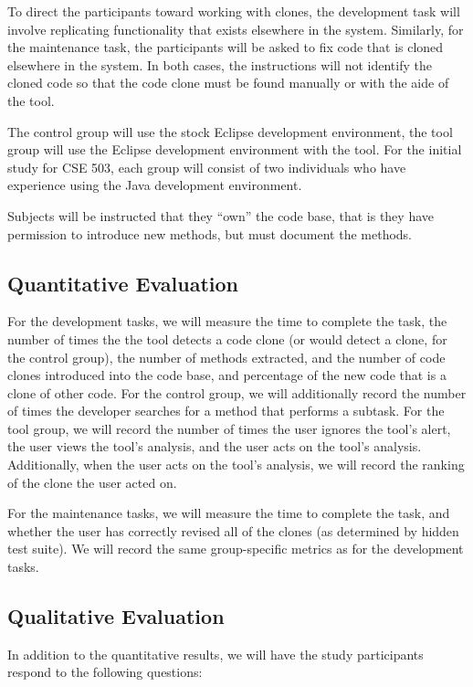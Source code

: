 \documentclass[preprint,10pt]{sigplanconf}
\newcommand{\todo}[1]{{\bfseries [[#1]]}}
\begin{document}
To direct the participants toward working with clones, the development
task will involve replicating functionality that exists elsewhere in
the system. Similarly, for the maintenance task, the participants will
be asked to fix code that is cloned elsewhere in the system. In both
cases, the instructions will not identify the cloned code so that the
code clone must be found manually or with the aide of the tool.


The control group will use the stock Eclipse development
environment, the tool group will use the Eclipse development
environment with the tool. For the initial study for CSE 503, each
group will consist of two individuals who have experience using the
Java development environment.  

Subjects will be instructed that they ``own'' the code base, that is they
have permission to introduce new methods, but must document the
methods.  

\subsection{Quantitative Evaluation}
For the development tasks, we will measure the time to complete the
task, the number of times the the tool detects a code clone (or would
detect a clone, for the control group),
the number of methods extracted, and the number of code clones
introduced into the code base, and percentage of the new code that is
a clone of other code. 
For the control group, we will additionally
record the number of times the developer searches for a method that
performs a subtask. 
For the tool group, we will record the number of
times the user ignores the tool's
alert, the user views the tool's analysis, and the user acts on the
tool's analysis. Additionally, when the user acts on the tool's
analysis, we will record the ranking of the clone the user acted on.

For the maintenance tasks, we will measure the time to complete the
task, and whether the user has correctly revised all of the clones (as
determined by hidden test suite). We will record the same
group-specific metrics as for the development tasks.

\subsection{Qualitative Evaluation}
In addition to the quantitative results, we will have the study
participants respond to the following questions:
\end{document}
